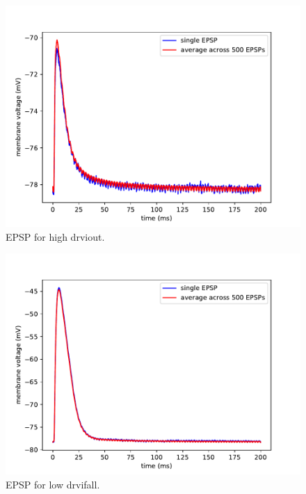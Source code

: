 \documentclass[10pt,a4paper]{article}
\begin{document}
\begin{figure}[ht]
    \centering
    \includegraphics[width=\textwidth]{figures/epsp_out_+.pdf}
    \caption{EPSP for high drviout.}
    \label{fig:epsp_out+}
\end{figure}
\begin{figure}[ht]
    \centering
    \includegraphics[width=\textwidth]{figures/epsp_fall_-.pdf}
    \caption{EPSP for low drvifall.}
    \label{fig:epsp_fall-}
\end{figure}
\end{document}
